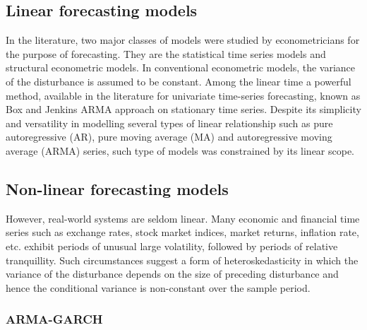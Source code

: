 \subsection{Linear forecasting models}

In the literature, two major classes of models were studied by econometricians for the purpose of forecasting. They are the statistical time series models and structural econometric models. In conventional econometric models, the variance of the disturbance is assumed to be constant.  Among the linear time a powerful method, available in the literature for univariate time-series forecasting, known as Box and Jenkins \cite{B&J} ARMA approach on stationary time series. Despite its simplicity and versatility in modelling several types of linear relationship such as pure autoregressive (AR), pure moving average (MA) and autoregressive moving average (ARMA) series, such type of models was constrained by its linear scope. 

\subsection{Non-linear forecasting models}

However, real-world systems are seldom linear. Many economic and financial time series such as exchange rates, stock market indices, market returns, inflation rate, etc. exhibit periods of unusual large volatility, followed by periods of relative tranquillity. Such circumstances suggest a form of heteroskedasticity in which the variance of the disturbance depends on the size of preceding disturbance and hence the conditional variance is non-constant over the sample period. 

\subsubsection{ARMA-GARCH}

